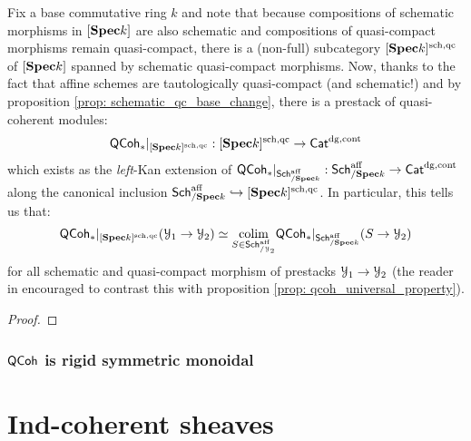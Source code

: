                    \begin{remark} \label{remark: qcoh_on_schematic_qs_prestacks}
                        Fix a base commutative ring $k$ and note that because compositions of schematic morphisms in $[\mathbf{Spec} k]$ are also schematic and compositions of quasi-compact morphisms remain quasi-compact, there is a (non-full) subcategory $[\mathbf{Spec} k]^{\mathrm{sch}, \mathrm{qc}}$ of $[\mathbf{Spec} k]$ spanned by schematic quasi-compact morphisms. Now, thanks to the fact that affine schemes are tautologically quasi-compact (and schematic!) and by proposition \ref{prop: schematic_qc_base_change}, there is a  prestack of quasi-coherent modules:
                            $$\mathsf{QCoh}_*|_{[\mathbf{Spec} k]^{\mathrm{sch}, \mathrm{qc}}}: [\mathbf{Spec} k]^{\mathrm{sch}, \mathrm{qc}} \to \mathsf{Cat}^{\mathrm{dg}, \mathrm{cont}}$$
                        which exists as the \textit{left}-Kan extension of $\mathsf{QCoh}_*|_{\mathsf{Sch}^{\mathrm{aff}}_{/\mathbf{Spec} k}}: \mathsf{Sch}^{\mathrm{aff}}_{/\mathbf{Spec} k} \to \mathsf{Cat}^{\mathrm{dg}, \mathrm{cont}}$ along the canonical inclusion $\mathsf{Sch}^{\mathrm{aff}}_{/\mathbf{Spec} k} \hookrightarrow [\mathbf{Spec} k]^{\mathrm{sch}, \mathrm{qc}}$. In particular, this tells us that:
                            $$\mathsf{QCoh}_*|_{[\mathbf{Spec} k]^{\mathrm{sch}, \mathrm{qc}}}(\mathcal{Y}_1 \to \mathcal{Y}_2) \simeq \underset{S \in \mathsf{Sch}^{\mathrm{aff}}_{/\mathcal{Y}_2}}{\operatorname{colim}} \mathsf{QCoh}_*|_{\mathsf{Sch}^{\mathrm{aff}}_{/\mathbf{Spec} k}}(S \to \mathcal{Y}_2)$$
                        for all schematic and quasi-compact morphism of prestacks $\mathcal{Y}_1 \to \mathcal{Y}_2$ (the reader in encouraged to contrast this with proposition \ref{prop: qcoh_universal_property}).
                    \end{remark}
                    
                    \begin{proposition} \label{prop: smooth_qcqs_base_change}
                        
                    \end{proposition}
                        \begin{proof}
                            
                        \end{proof}
                    
            \subsubsection{\texorpdfstring{$\mathsf{QCoh}$}{} is rigid symmetric monoidal}
        
    \section{Ind-coherent sheaves}
